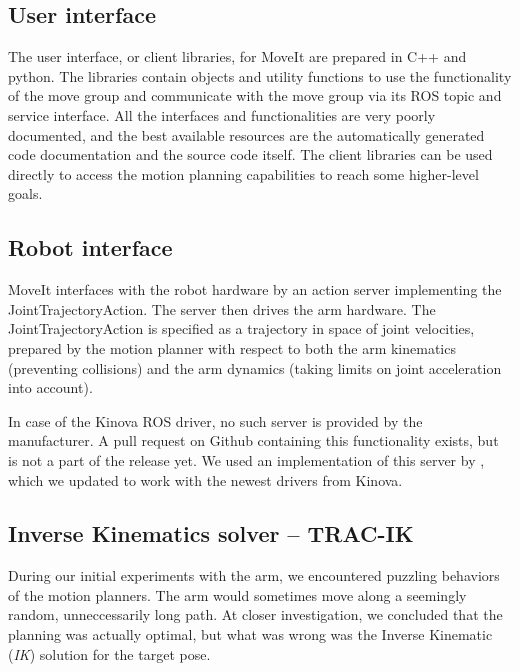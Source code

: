\documentclass[buriama8_dp.tex]{subfiles}
\begin{document}
\subsection{User interface}
\label{subsec:moveit_ui}

The user interface, or client libraries, for MoveIt are prepared in C++ and python. The libraries contain objects and utility functions to use the functionality of the move group and communicate with the move group via its ROS topic and service interface. All the interfaces and functionalities are very poorly documented, and the best available resources are the automatically generated code documentation and the source code itself. The client libraries can be used directly to access the motion planning capabilities to reach some higher-level goals.


\subsection{Robot interface}
\label{subsec:moveut_ri}

MoveIt interfaces with the robot hardware by an action server implementing the JointTrajectoryAction. The server then drives the arm hardware. The JointTrajectoryAction is specified as a trajectory in space of joint velocities, prepared by the motion planner with respect to both the arm kinematics (preventing collisions) and the arm dynamics (taking limits on joint acceleration into account).

In case of the Kinova ROS driver, no such server is provided by the manufacturer. A pull request on Github containing this functionality exists, but is not a part of the release yet. We used an implementation of this server by , which we updated to work with the newest drivers from Kinova.

\subsection{Inverse Kinematics solver -- TRAC-IK}
\label{subsec:tracik}

During our initial experiments with the arm, we encountered puzzling behaviors of the motion planners. The arm would sometimes move along a seemingly random, unneccessarily long path. At closer investigation, we concluded that the planning was actually optimal, but what was wrong was the Inverse Kinematic (\emph{IK}) solution for the target pose.

\end{document}

